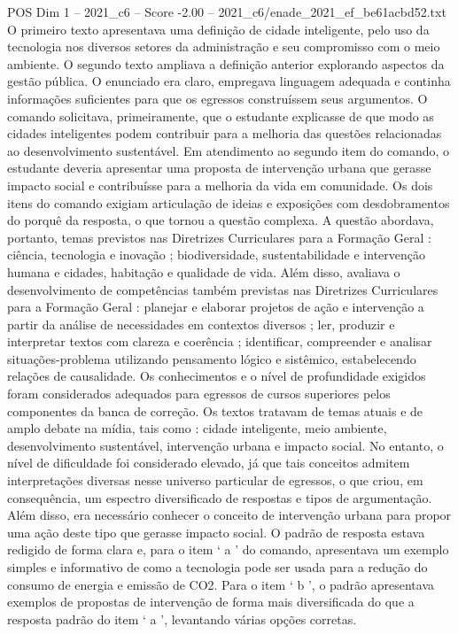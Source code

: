 \begin{textsample}{POS Dim 1 – 2021\_c6 – Score -2.00 – 2021\_c6/enade\_2021\_ef\_be61acbd52.txt}
O primeiro texto apresentava uma definição de cidade inteligente, pelo uso da tecnologia nos diversos setores da administração e seu compromisso com o meio ambiente.
O segundo texto ampliava a definição anterior explorando aspectos da gestão pública.
O enunciado era claro, empregava linguagem adequada e continha informações suficientes para que os egressos construíssem seus argumentos.
O comando solicitava, primeiramente, que o estudante explicasse de que modo as cidades inteligentes podem contribuir para a melhoria das questões relacionadas ao desenvolvimento sustentável.
Em atendimento ao segundo item do comando, o estudante deveria apresentar uma proposta de intervenção urbana que gerasse impacto social e contribuísse para a melhoria da vida em comunidade.
Os dois itens do comando exigiam articulação de ideias e exposições com desdobramentos do porquê da resposta, o que tornou a questão complexa.
A questão abordava, portanto, temas previstos nas Diretrizes Curriculares para a Formação Geral : ciência, tecnologia e inovação ; biodiversidade, sustentabilidade e intervenção humana e cidades, habitação e qualidade de vida.
Além disso, avaliava o desenvolvimento de competências também previstas nas Diretrizes Curriculares para a Formação Geral : planejar e elaborar projetos de ação e intervenção a partir da análise de necessidades em contextos diversos ; ler, produzir e interpretar textos com clareza e coerência ; identificar, compreender e analisar situações-problema utilizando pensamento lógico e sistêmico, estabelecendo relações de causalidade.
Os conhecimentos e o nível de profundidade exigidos foram considerados adequados para egressos de cursos superiores pelos componentes da banca de correção.
Os textos tratavam de temas atuais e de amplo debate na mídia, tais como : cidade inteligente, meio ambiente, desenvolvimento sustentável, intervenção urbana e impacto social.
No entanto, o nível de dificuldade foi considerado elevado, já que tais conceitos admitem interpretações diversas nesse universo particular de egressos, o que criou, em consequência, um espectro diversificado de respostas e tipos de argumentação.
Além disso, era necessário conhecer o conceito de intervenção urbana para propor uma ação deste tipo que gerasse impacto social.
O padrão de resposta estava redigido de forma clara e, para o item ‘ a ’ do comando, apresentava um exemplo simples e informativo de como a tecnologia pode ser usada para a redução do consumo de energia e emissão de CO2.
Para o item ‘ b ’, o padrão apresentava exemplos de propostas de intervenção de forma mais diversificada do que a resposta padrão do item ‘ a ’, levantando várias opções corretas.

\end{textsample}
